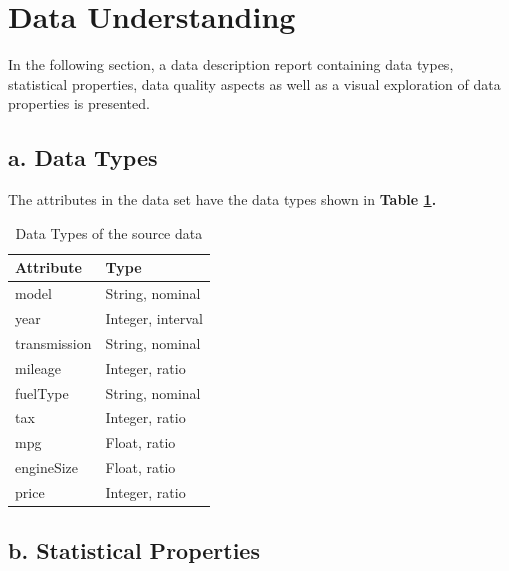 \documentclass[sigchi]{acmart}
\begin{document}
\hypertarget{data-understanding}{%
\section{Data Understanding}\label{data-understanding}}

In the following section, a data description report containing data types, statistical properties, data quality aspects as well as a visual exploration of data properties is presented.

\hypertarget{a.-data-types}{%
\subsection{a. Data Types}\label{a.-data-types}}

The attributes in the data set have the data types shown in \textbf{Table \ref{tab:table-datatypes}.}

\begin{table}

\caption{\label{tab:table-datatypes}Data Types of the source data}
\centering
\begin{tabular}[t]{ll}
\toprule
Attribute & Type\\
\midrule
model & String, nominal\\
year & Integer, interval\\
transmission & String, nominal\\
mileage & Integer, ratio\\
fuelType & String, nominal\\
\addlinespace
tax & Integer, ratio\\
mpg & Float, ratio\\
engineSize & Float, ratio\\
price & Integer, ratio\\
\bottomrule
\end{tabular}
\end{table}

\hypertarget{b.-statistical-properties}{%
\subsection{b. Statistical Properties}\label{b.-statistical-properties}}
\end{document}
